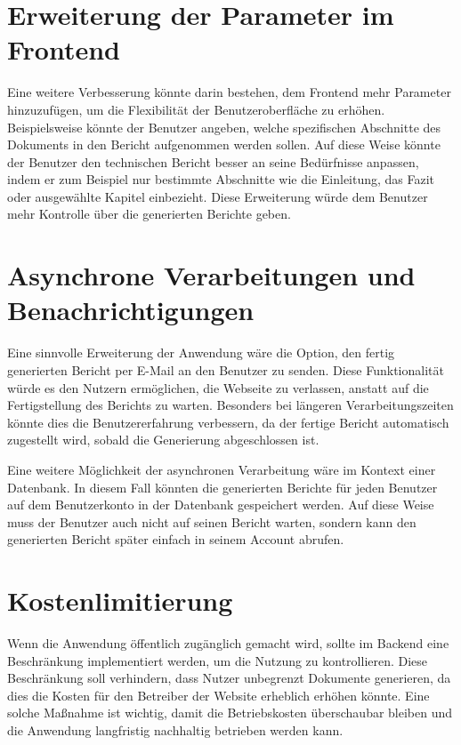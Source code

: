 \section{Erweiterung der Parameter im Frontend}

Eine weitere Verbesserung könnte darin bestehen, dem Frontend mehr Parameter hinzuzufügen, um die Flexibilität der Benutzeroberfläche zu erhöhen. Beispielsweise könnte der Benutzer angeben, welche spezifischen Abschnitte des Dokuments in den Bericht aufgenommen werden sollen. Auf diese Weise könnte der Benutzer den technischen Bericht besser an seine Bedürfnisse anpassen, indem er zum Beispiel nur bestimmte Abschnitte wie die Einleitung, das Fazit oder ausgewählte Kapitel einbezieht. Diese Erweiterung würde dem Benutzer mehr Kontrolle über die generierten Berichte geben.

\section{Asynchrone Verarbeitungen und Benachrichtigungen}

Eine sinnvolle Erweiterung der Anwendung wäre die Option, den fertig generierten Bericht per E-Mail an den Benutzer zu senden. Diese Funktionalität würde es den Nutzern ermöglichen, die Webseite zu verlassen, anstatt auf die Fertigstellung des Berichts zu warten. Besonders bei längeren Verarbeitungszeiten könnte dies die Benutzererfahrung verbessern, da der fertige Bericht automatisch zugestellt wird, sobald die Generierung abgeschlossen ist. 

Eine weitere Möglichkeit der asynchronen Verarbeitung wäre im Kontext einer Datenbank. In diesem Fall könnten die generierten Berichte für jeden Benutzer auf dem Benutzerkonto in der Datenbank gespeichert werden. Auf diese Weise muss der Benutzer auch nicht auf seinen Bericht warten, sondern kann den generierten Bericht später einfach in seinem Account abrufen.

\section{Kostenlimitierung}

Wenn die Anwendung öffentlich zugänglich gemacht wird, sollte im Backend eine Beschränkung implementiert werden, um die Nutzung zu kontrollieren. Diese Beschränkung soll verhindern, dass Nutzer unbegrenzt Dokumente generieren, da dies die Kosten für den Betreiber der Website erheblich erhöhen könnte. Eine solche Maßnahme ist wichtig, damit die Betriebskosten überschaubar bleiben und die Anwendung langfristig nachhaltig betrieben werden kann. 

